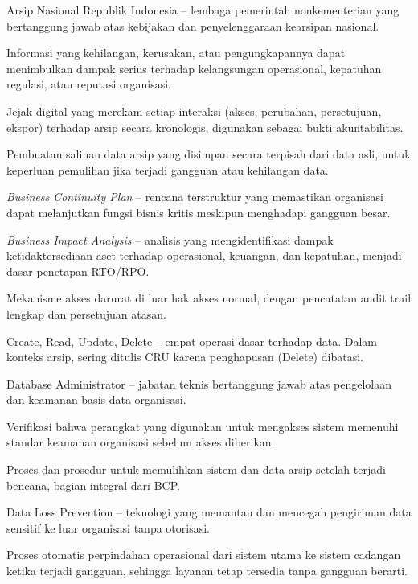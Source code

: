 \documentclass[12pt,a4paper]{report}
\begin{document}
{\small
\begin{description}[leftmargin=2.5cm, style=nextline]
    \item[ANRI] Arsip Nasional Republik Indonesia -- lembaga pemerintah nonkementerian yang bertanggung jawab atas kebijakan dan penyelenggaraan kearsipan nasional.
    \item[Aset Informasi Kritis] Informasi yang kehilangan, kerusakan, atau pengungkapannya dapat menimbulkan dampak serius terhadap kelangsungan operasional, kepatuhan regulasi, atau reputasi organisasi.
    \item[Audit Trail] Jejak digital yang merekam setiap interaksi (akses, perubahan, persetujuan, ekspor) terhadap arsip secara kronologis, digunakan sebagai bukti akuntabilitas.
    \item[Backup] Pembuatan salinan data arsip yang disimpan secara terpisah dari data asli, untuk keperluan pemulihan jika terjadi gangguan atau kehilangan data.
    \item[BCP] \textit{Business Continuity Plan} -- rencana terstruktur yang memastikan organisasi dapat melanjutkan fungsi bisnis kritis meskipun menghadapi gangguan besar.
    \item[BIA] \textit{Business Impact Analysis} -- analisis yang mengidentifikasi dampak ketidaktersediaan aset terhadap operasional, keuangan, dan kepatuhan, menjadi dasar penetapan RTO/RPO.
    \item[\textit{Break-Glass Procedure}] Mekanisme akses darurat di luar hak akses normal, dengan pencatatan audit trail lengkap dan persetujuan atasan.
    \item[CRUD/CRU] Create, Read, Update, Delete -- empat operasi dasar terhadap data. Dalam konteks arsip, sering ditulis CRU karena penghapusan (Delete) dibatasi.
    \item[DBA] Database Administrator -- jabatan teknis bertanggung jawab atas pengelolaan dan keamanan basis data organisasi.
    \item[Device Trust] Verifikasi bahwa perangkat yang digunakan untuk mengakses sistem memenuhi standar keamanan organisasi sebelum akses diberikan.
    \item[Disaster Recovery (DR)] Proses dan prosedur untuk memulihkan sistem dan data arsip setelah terjadi bencana, bagian integral dari BCP.
    \item[DLP] Data Loss Prevention -- teknologi yang memantau dan mencegah pengiriman data sensitif ke luar organisasi tanpa otorisasi.
    \item[Failover] Proses otomatis perpindahan operasional dari sistem utama ke sistem cadangan ketika terjadi gangguan, sehingga layanan tetap tersedia tanpa gangguan berarti.

\end{description}}
\end{document}
